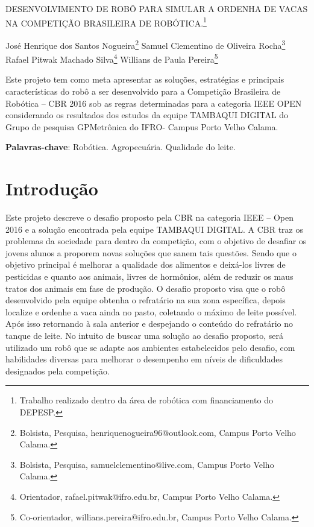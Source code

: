 \documentclass[article,12pt,onesidea,4paper,english,brazil]{abntex2}
\begin{document}
	
	
	\frenchspacing 
	
	\begin{center}
		\LARGE DESENVOLVIMENTO DE ROBÔ PARA SIMULAR A ORDENHA DE VACAS NA COMPETIÇÃO BRASILEIRA DE ROBÓTICA.\footnote{ Trabalho realizado dentro da área de robótica com financiamento do DEPESP.}
		
		\normalsize
		José Henrique dos Santos Nogueira\footnote{Bolsista, Pesquisa, henriquenogueira96@outlook.com, Campus Porto Velho Calama.} 
		Samuel Clementino de Oliveira Rocha\footnote{Bolsista, Pesquisa, samuelclementino@live.com, Campus Porto Velho Calama.} 
	Rafael Pitwak Machado Silva\footnote{ Orientador, rafael.pitwak@ifro.edu.br, Campus Porto Velho Calama.} 
		Willians de Paula Pereira\footnote{ Co-orientador, willians.pereira@ifro.edu.br, Campus Porto Velho Calama.} 
	\end{center}
	
	\begin{resumoumacoluna}
		Este projeto tem como meta apresentar as soluções, estratégias e principais características do robô a ser desenvolvido para a Competição Brasileira de Robótica – CBR 2016 sob as regras determinadas para a categoria IEEE OPEN considerando os resultados dos estudos da equipe TAMBAQUI DIGITAL do Grupo de pesquisa GPMetrônica do IFRO- Campus Porto Velho Calama.
		
		\vspace{\onelineskip}
		
		\noindent
		\textbf{Palavras-chave}: Robótica. Agropecuária. Qualidade do leite.
	\end{resumoumacoluna}
	
	\section*{Introdução}
	
	Este projeto descreve o desafio proposto pela CBR na categoria IEEE – Open 2016 e a solução encontrada pela equipe TAMBAQUI DIGITAL. A CBR traz os problemas da sociedade para dentro da competição, com o objetivo de desafiar os jovens alunos a proporem novas soluções que sanem tais questões. Sendo que o objetivo principal é melhorar a qualidade dos alimentos e deixá-los livres de pesticidas e quanto aos animais, livres de hormônios, além de reduzir os maus tratos dos animais em fase de produção. O desafio proposto visa que o robô desenvolvido pela equipe obtenha o refratário na sua zona específica, depois localize e ordenhe a vaca ainda no pasto, coletando o máximo de leite possível. Após isso retornando à sala anterior e despejando o conteúdo do refratário no tanque de leite. No intuito de buscar uma solução ao desafio proposto, será utilizado um robô que se adapte aos ambientes estabelecidos pelo desafio, com habilidades diversas para melhorar o desempenho em níveis de dificuldades designados pela competição.
	
\end{document}
